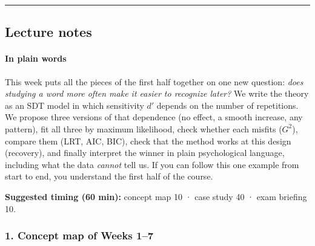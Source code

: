 \begin{center}\rule{0.5\linewidth}{0.5pt}\end{center}


\subsection{Lecture notes}

\paragraph{In plain words}

This week puts all the pieces of the first half together on one new
question: \emph{does studying a word more often make it easier to
recognize later?} We write the theory as an SDT model in which
sensitivity \(d'\) depends on the number of repetitions. We propose
three versions of that dependence (no effect, a smooth increase, any
pattern), fit all three by maximum likelihood, check whether each
misfits (\(G^2\)), compare them (LRT, AIC, BIC), check that the method
works at this design (recovery), and finally interpret the winner in
plain psychological language, including what the data \emph{cannot} tell
us. If you can follow this one example from start to end, you understand
the first half of the course.

\textbf{Suggested timing (60 min):} concept map 10 · case study 40 ·
exam briefing 10.

\subsubsection{1. Concept map of Weeks 1--7}

